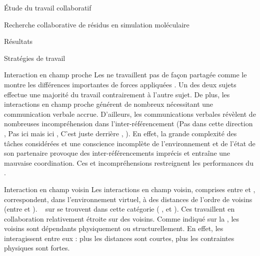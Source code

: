 \documentclass[myfrancais]{mythesis}
\begin{document}
\begin{mypart}{Étude du travail collaboratif}
\begin{mychapter}{Recherche collaborative de résidus en simulation moléculaire}
\begin{mysection}{Résultats}
\begin{mysubsection}{Stratégies de travail}
\begin{mysubsubsection}{Interaction en champ proche}
						Les  ne travaillent pas de façon partagée comme le montre les différences importantes de forces appliquées .
						Un des deux sujets effectue une majorité du travail contrairement à l'autre sujet.
						De plus, les interactions en champ proche générent de nombreux  nécessitant une communication verbale accrue.
						D'ailleurs, les communications verbales révèlent de nombreuses incompréhension dans l'inter-référencement (\og Pas dans cette direction \fg, \og Pas ici mais ici \fg, \og C'est juste derrière \fg, \myetc).
						En effet, la grande complexité des tâches considérées et une conscience incomplète de l'environnement et de l'état de son partenaire provoque des inter-référencements imprécis et entraîne une mauvaise coordination.
						Ces  et incompréhensions restreignent les performances du .
					\end{mysubsubsection}
					\begin{mysubsubsection}{Interaction en champ voisin}
						Les interactions en champ voisin, comprises entre  et , correspondent, dans l'environnement virtuel, à des distances de l'ordre de  voisins (entre  et ).
						~ sur  se trouvent dans cette catégorie ( ,  et ).
						Ces  travaillent en collaboration relativement étroite sur des  voisins.
						Comme indiqué sur la , les  voisins sont dépendants physiquement ou structurellement.
						En effet, les  interagissent entre eux : plus les distances sont courtes, plus les contraintes physiques sont fortes.


\end{mysubsubsection}
\end{mysubsection}
\end{mysection}
\end{mychapter}
\end{mypart}
\end{document}
